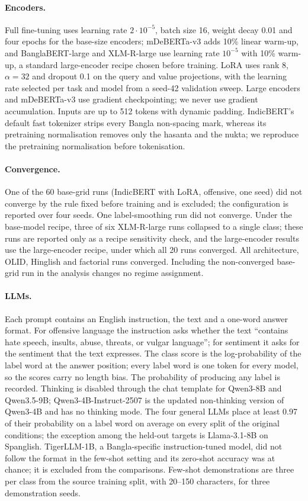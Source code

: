 \paragraph{Encoders.}
Full fine-tuning uses learning rate $2 \cdot 10^{-5}$, batch size 16, weight decay 0.01 and four epochs for the
base-size encoders; mDeBERTa-v3 adds 10\% linear warm-up, and BanglaBERT-large and XLM-R-large use learning rate
$10^{-5}$ with 10\% warm-up, a standard large-encoder recipe chosen before training. LoRA uses rank 8, $\alpha = 32$ and
dropout 0.1 on the query and value projections, with the learning rate selected per task and model from a seed-42
validation sweep. Large encoders and mDeBERTa-v3 use gradient checkpointing; we never use gradient accumulation. Inputs
are up to 512 tokens with dynamic padding. IndicBERT's default fast tokenizer strips every Bangla non-spacing mark,
whereas its pretraining normalisation removes only the hasanta and the nukta; we reproduce the pretraining
normalisation before tokenisation.

\paragraph{Convergence.}
One of the 60 base-grid runs (IndicBERT with LoRA, offensive, one seed) did not converge by the rule fixed before training and
is excluded; the configuration is reported over four seeds. One label-smoothing run did not converge. Under the
base-model recipe, three of six XLM-R-large runs collapsed to a single class; these runs are reported only as a recipe
sensitivity check, and the large-encoder results use the large-encoder recipe, under which all 20 runs converged. All
architecture, OLID, Hinglish and factorial runs converged. Including the non-converged base-grid run in the analysis
changes no regime assignment.

\paragraph{LLMs.}
Each prompt contains an English instruction, the text and a one-word answer format. For offensive language the
instruction asks whether the text ``contains hate speech, insults, abuse, threats, or vulgar language''; for sentiment it
asks for the sentiment that the text expresses. The class score is the log-probability of the label word at the answer
position; every label word is one token for every model, so the scores carry no length bias. The probability of
producing any label is recorded. Thinking
is disabled through the chat template for Qwen3-8B and Qwen3.5-9B; Qwen3-4B-Instruct-2507 is the updated non-thinking
version of Qwen3-4B and has no thinking mode. The four
general LLMs place at least 0.97 of their probability on a label word on average on every split of the original
conditions; the exception among the held-out targets is Llama-3.1-8B on Spanglish. TigerLLM-1B, a Bangla-specific
instruction-tuned model, did not follow the format in the few-shot setting and its zero-shot accuracy was at chance;
it is excluded from the comparisons. Few-shot demonstrations are three per class from the source training split, with
20--150 characters, for three demonstration seeds.

